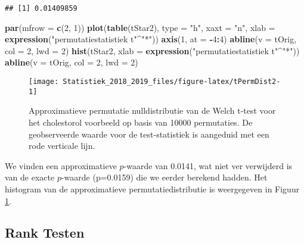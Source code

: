 \documentclass[12pt,dutch,coursenotes]{book}
\newenvironment{Shaded}{\begin{snugshade}}{\end{snugshade}}
\newcommand{\KeywordTok}[1]{\textcolor[rgb]{0.13,0.29,0.53}{\textbf{#1}}}
\newcommand{\DataTypeTok}[1]{\textcolor[rgb]{0.13,0.29,0.53}{#1}}
\newcommand{\DecValTok}[1]{\textcolor[rgb]{0.00,0.00,0.81}{#1}}
\newcommand{\StringTok}[1]{\textcolor[rgb]{0.31,0.60,0.02}{#1}}
\newcommand{\OperatorTok}[1]{\textcolor[rgb]{0.81,0.36,0.00}{\textbf{#1}}}
\newcommand{\NormalTok}[1]{#1}
\theoremstyle{definition}
\theoremstyle{definition}
\theoremstyle{definition}
\theoremstyle{remark}
\begin{document}
\begin{verbatim}
## [1] 0.01409859
\end{verbatim}

\begin{Shaded}
\begin{Highlighting}[]
\KeywordTok{par}\NormalTok{(}\DataTypeTok{mfrow =} \KeywordTok{c}\NormalTok{(}\DecValTok{2}\NormalTok{, }\DecValTok{1}\NormalTok{))}
\KeywordTok{plot}\NormalTok{(}\KeywordTok{table}\NormalTok{(tStar2), }\DataTypeTok{type =} \StringTok{"h"}\NormalTok{, }\DataTypeTok{xaxt =} \StringTok{"n"}\NormalTok{, }\DataTypeTok{xlab =} \KeywordTok{expression}\NormalTok{(}\StringTok{"permutatiestatistiek t"}\OperatorTok{^}\StringTok{"*"}\NormalTok{))}
\KeywordTok{axis}\NormalTok{(}\DecValTok{1}\NormalTok{, }\DataTypeTok{at =} \OperatorTok{-}\DecValTok{4}\OperatorTok{:}\DecValTok{4}\NormalTok{)}
\KeywordTok{abline}\NormalTok{(}\DataTypeTok{v =}\NormalTok{ tOrig, }\DataTypeTok{col =} \DecValTok{2}\NormalTok{, }\DataTypeTok{lwd =} \DecValTok{2}\NormalTok{)}
\KeywordTok{hist}\NormalTok{(tStar2, }\DataTypeTok{xlab =} \KeywordTok{expression}\NormalTok{(}\StringTok{"permutatiestatistiek t"}\OperatorTok{^}\StringTok{"*"}\NormalTok{))}
\KeywordTok{abline}\NormalTok{(}\DataTypeTok{v =}\NormalTok{ tOrig, }\DataTypeTok{col =} \DecValTok{2}\NormalTok{, }\DataTypeTok{lwd =} \DecValTok{2}\NormalTok{)}
\end{Highlighting}
\end{Shaded}

\begin{figure}

{\centering \texttt{[image: Statistiek\_2018\_2019\_files/figure-latex/tPermDist2-1]} 

}

\caption{Approximatieve permutatie nulldistributie van de Welch t-test voor het cholestorol voorbeeld op basis van 10000 permutaties. De geobserveerde waarde voor de test-statistiek is aangeduid met een rode verticale lijn.}\label{fig:tPermDist2}
\end{figure}

We vinden een approximatieve \(p\)-waarde van 0.0141, wat niet ver
verwijderd is van de exacte \(p\)-waarde (p=0.0159) die we eerder
berekend hadden. Het histogram van de approximatieve
permutatiedistributie is weergegeven in Figuur \ref{fig:tPermDist2}.

\subsection{Rank Testen}\label{rank-testen}
\end{document}

